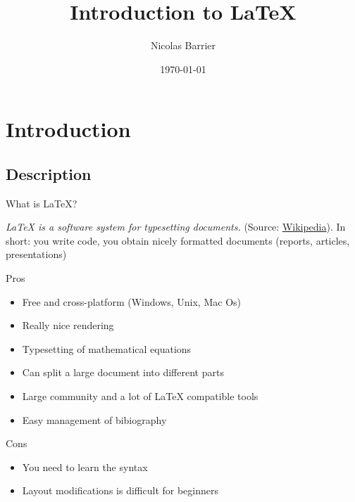 \documentclass[10pt]{beamer}
\author{Nicolas Barrier}
\title{Introduction to \LaTeX}
\institute{
    UMR MARBEC
}
\date{\today}
\begin{document}
\lstset{style=mytex}

\frame{\titlepage}




\section{Introduction}
\subsection{Description}

\begin{frame}{What is \LaTeX{}?}

\emph{\LaTeX{} is a software system for typesetting documents.} (Source: \href{https://en.wikipedia.org/wiki/LaTeX}{Wikipedia}). In short: you write code, you obtain nicely formatted documents (reports, articles, presentations) \\

\begin{block}{Pros}
\begin{itemize}
\item{Free and cross-platform (Windows, Unix, Mac Os)}
\item{Really nice rendering}
\item{Typesetting of mathematical equations}
\item{Can split a large document into different parts}
\item{Large community and a lot of \LaTeX{} compatible tools}
\item{Easy management of bibiography}
\end{itemize}
\end{block}

\begin{alertblock}{Cons}
\begin{itemize}
\item{You need to learn the syntax}
\item{Layout modifications is difficult for beginners}
\end{itemize}

\end{alertblock}

\end{frame}
\end{document}
